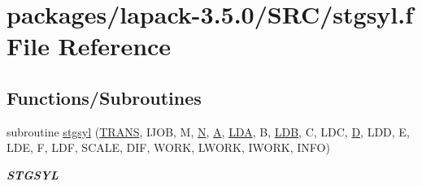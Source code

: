 \hypertarget{stgsyl_8f}{}\section{packages/lapack-\/3.5.0/\+S\+R\+C/stgsyl.f File Reference}
\label{stgsyl_8f}
\subsection*{Functions/\+Subroutines}
\begin{DoxyCompactItemize}
\item 
subroutine \hyperlink{group__realSYcomputational_ga7be8a5fb25c1b67ea888747c1334d996}{stgsyl} (\hyperlink{superlu__enum__consts_8h_a0c4e17b2d5cea33f9991ccc6a6678d62a1f61e3015bfe0f0c2c3fda4c5a0cdf58}{T\+R\+A\+N\+S}, I\+J\+O\+B, M, \hyperlink{polmisc_8c_a0240ac851181b84ac374872dc5434ee4}{N}, \hyperlink{classA}{A}, \hyperlink{example__user_8c_ae946da542ce0db94dced19b2ecefd1aa}{L\+D\+A}, B, \hyperlink{example__user_8c_a50e90a7104df172b5a89a06c47fcca04}{L\+D\+B}, C, L\+D\+C, \hyperlink{odrpack_8h_a7dae6ea403d00f3687f24a874e67d139}{D}, L\+D\+D, E, L\+D\+E, F, L\+D\+F, S\+C\+A\+L\+E, D\+I\+F, W\+O\+R\+K, L\+W\+O\+R\+K, I\+W\+O\+R\+K, I\+N\+F\+O)
\begin{DoxyCompactList}\small\item\em {\bfseries S\+T\+G\+S\+Y\+L} \end{DoxyCompactList}\end{DoxyCompactItemize}
